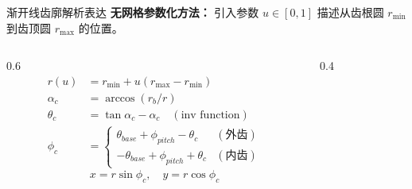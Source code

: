 \documentclass[aspectratio=169,10pt,xcolor=table]{ctexbeamer}
\begin{document}
\begin{frame}{渐开线齿廓解析表达}
  \textbf{无网格参数化方法：}
  引入参数 $u \in [0, 1]$ 描述从齿根圆 $r_{\min}$ 到齿顶圆 $r_{\max}$ 的位置。
  
  \begin{columns}
    \begin{column}{0.6\textwidth}
      \small
      \begin{align}
      r(u) &= r_{\min} + u (r_{\max} - r_{\min}) \\
      \alpha_c &= \arccos(r_b / r) \\
      \theta_c &= \tan\alpha_c - \alpha_c \quad (\text{inv function}) \\
      \phi_c &= \begin{cases}
        \theta_{base} + \phi_{pitch} - \theta_c & (\text{外齿}) \\
        -\theta_{base} + \phi_{pitch} + \theta_c & (\text{内齿})
      \end{cases}
      \end{align}
      \vspace{-1em}
      \begin{equation}
      x = r \sin\phi_c, \quad y = r \cos\phi_c
      \end{equation}
    \end{column}
    \begin{column}{0.4\textwidth}
      \centering
    \end{column}
  \end{columns}
\end{frame}
\end{document}
